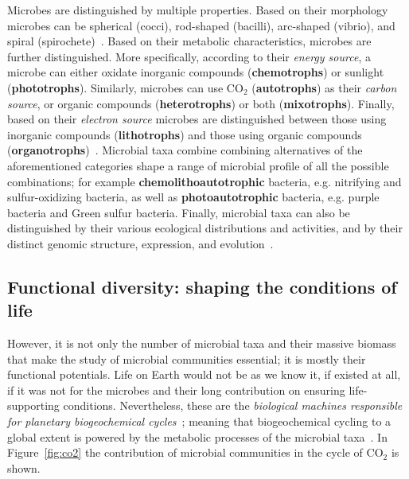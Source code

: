       Microbes are distinguished by multiple properties.
      Based on their morphology microbes can be spherical (cocci), rod-shaped (bacilli),
      arc-shaped (vibrio), and spiral (spirochete)~\citep{dunlap2001microbial}.
      Based on their metabolic characteristics, microbes are further distinguished. 
      More specifically, according to their \textit{energy source}, a microbe
      can either oxidate inorganic compounds (\textbf{chemotrophs}) or sunlight (\textbf{phototrophs}).
      Similarly, microbes can use CO$_2$ (\textbf{autotrophs}) as their \textit{carbon source},
      or organic compounds (\textbf{heterotrophs}) or both (\textbf{mixotrophs}).
      Finally, based on their \textit{electron source} 
      microbes are distinguished between those using inorganic compounds (\textbf{lithotrophs}) and those using organic compounds (\textbf{organotrophs})~\citep{madigan2018brock}.
      Microbial taxa combine combining alternatives of the aforementioned categories 
      shape a range of microbial profile of all the possible combinations; for example      \textbf{chemolithoautotrophic} bacteria, 
      e.g. nitrifying and sulfur-oxidizing bacteria, as well
      as \textbf{photoautotrophic} bacteria, 
      e.g. purple bacteria and Green sulfur bacteria. 
      Finally, microbial taxa can also be distinguished by their various ecological distributions and activities, 
      and by their distinct genomic structure, expression, and evolution~\citep{dunlap2001microbial}. 

   \subsection{Functional diversity: shaping the conditions of life}
   \label{subsec:functional_diversity}
      However, it is not only the number of microbial taxa and their massive biomass that
      make the study of microbial communities essential; 
      it is mostly their functional potentials. 
      Life on Earth would not be as we know it, if existed at all, if it was not for the 
      microbes and their long contribution on ensuring life-supporting conditions. 
      Nevertheless, these are the \textit{biological machines responsible for planetary
      biogeochemical cycles}~\citep{falkowski2008microbial}; meaning that biogeochemical cycling 
      to a global extent
      is powered by the metabolic processes of the microbial taxa~\citep{louca2016decoupling}. 
      In Figure~\ref{fig:co2} the contribution of microbial communities 
      in the cycle of CO$_2$ is shown. 

